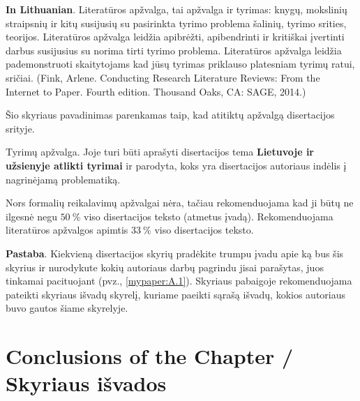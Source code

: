 \textbf{In Lithuanian}. Literatūros apžvalga, tai apžvalga ir tyrimas: knygų, mokslinių straipsnių ir kitų susijusių su pasirinkta tyrimo problema šalinių, tyrimo srities, teorijos. 
Literatūros apžvalga leidžia apibrėžti, apibendrinti ir kritiškai įvertinti darbus susijusius su norima tirti tyrimo problema.
Literatūros apžvalga leidžia pademonstruoti skaitytojams kad jūsų tyrimas priklauso platesniam tyrimų ratui, sričiai. (Fink, Arlene. Conducting Research Literature Reviews: From the Internet to Paper. Fourth edition. Thousand Oaks, CA: SAGE, 2014.) 


Šio skyriaus pavadinimas parenkamas taip, kad atitiktų apžvalgą disertacijos srityje.

Tyrimų apžvalga. Joje turi būti aprašyti disertacijos tema \textbf{Lietuvoje ir užsienyje atlikti tyrimai} ir parodyta, koks yra disertacijos autoriaus indėlis į nagrinėjamą problematiką.

Nors formalių reikalavimų apžvalgai nėra, tačiau rekomenduojama kad ji būtų ne ilgesnė negu $50\ \%$ viso disertacijos teksto (atmetus įvadą). Rekomenduojama literatūros apžvalgos apimtis $33\ \%$ viso disertacijos teksto.

\textbf{Pastaba}. Kiekvieną disertacijos skyrių pradėkite trumpu įvadu apie ką bus šis skyrius ir nurodykute kokių autoriaus darbų pagrindu jisai parašytas, juos tinkamai pacituojant (pvz., \ref{mypaper:A.1}). Skyriaus pabaigoje rekomenduojama pateikti skyriaus išvadų skyrelį, kuriame paeikti sąrašą išvadų, kokios autoriaus buvo gautos šiame skyrelyje.


\section{Conclusions of the Chapter / Skyriaus išvados}
